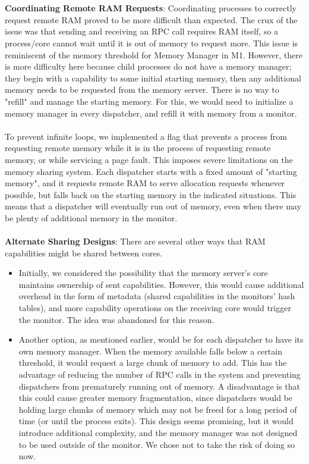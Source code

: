 \\\\
\textbf{Coordinating Remote RAM Requests}:
Coordinating processes to correctly request remote RAM proved to be more difficult than expected. The crux of the issue was that sending and receiving an RPC call requires RAM itself, so a process/core cannot wait until it is out of memory to request more. This issue is reminiscent of the memory threshold for Memory Manager in M1. However, there is more difficulty here because child processes do not have a memory manager; they begin with a capability to some initial starting memory, then any additional memory needs to be requested from the memory server. There is no way to "refill" and manage the starting memory. For this, we would need to initialize a memory manager in every dispatcher, and refill it with memory from a monitor.
\\\\
To prevent infinite loops, we implemented a flag that prevents a process from requesting remote memory while it is in the process of requesting remote memory, or while servicing a page fault. This imposes severe limitations on the memory sharing system. Each dispatcher starts with a fixed amount of "starting memory", and it requests remote RAM to serve allocation requests whenever possible, but falls back on the starting memory in the indicated situations. This means that a dispatcher will eventually run out of memory, even when there may be plenty of additional memory in the monitor.
\\\\
\textbf{Alternate Sharing Designs}: 
There are several other ways that RAM capabilities might be shared between cores.
\begin{itemize}
    \item Initially, we considered the possibility that the memory server's core maintains ownership of sent capabilities. However, this would cause additional overhead in the form of metadata (shared capabilities in the monitors' hash tables), and more capability operations on the receiving core would trigger the monitor. The idea was abandoned for this reason.
    \item Another option, as mentioned earlier, would be for each dispatcher to have its own memory manager. When the memory available falls below a certain threshold, it would request a large chunk of memory to add. This has the advantage of reducing the number of RPC calls in the system and preventing dispatchers from prematurely running out of memory. A disadvantage is that this could cause greater memory fragmentation, since dispatchers would be holding large chunks of memory which may not be freed for a long period of time (or until the process exits). This design seems promising, but it would introduce additional complexity, and the memory manager was not designed to be used outside of the monitor. We chose not to take the risk of doing so now.
\end{itemize}
